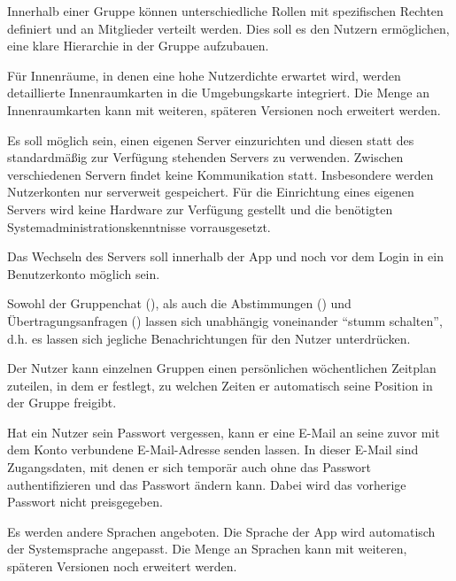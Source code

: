 \documentclass[parskip=full,11pt]{scrartcl}
\begin{document}
Innerhalb einer Gruppe können unterschiedliche Rollen
mit spezifischen Rechten definiert und an Mitglieder verteilt werden.
Dies soll es den Nutzern ermöglichen,
eine klare Hierarchie in der Gruppe aufzubauen.

%
Für Innenräume, in denen eine hohe Nutzerdichte erwartet wird, werden
detaillierte Innenraumkarten in die Umgebungskarte integriert. Die Menge an
Innenraumkarten kann mit weiteren, späteren Versionen noch erweitert werden.

%
Es soll möglich sein, einen eigenen Server einzurichten und diesen statt des
standardmäßig zur Verfügung stehenden Servers zu verwenden.
Zwischen verschiedenen Servern findet keine Kommunikation statt.
Insbesondere werden Nutzerkonten nur serverweit gespeichert.
Für die Einrichtung eines eigenen Servers wird keine Hardware zur Verfügung
gestellt und die benötigten Systemadministrationskenntnisse vorrausgesetzt.

%
Das Wechseln des Servers soll innerhalb der App und noch vor dem Login in ein
Benutzerkonto möglich sein.

%
Sowohl der Gruppenchat (), als auch die
Abstimmungen () und Übertragungsanfragen
() lassen sich unabhängig voneinander
\enquote{stumm schalten}, d.h. es lassen sich jegliche Benachrichtungen für den
Nutzer unterdrücken.

%
Der Nutzer kann einzelnen Gruppen einen persönlichen wöchentlichen Zeitplan
zuteilen, in dem er festlegt, zu welchen Zeiten er automatisch seine Position
in der Gruppe freigibt.

%
Hat ein Nutzer sein Passwort vergessen, kann er eine E-Mail an seine zuvor
mit dem Konto verbundene E-Mail-Adresse senden lassen.
In dieser E-Mail sind Zugangsdaten, mit denen er sich temporär auch ohne das
Passwort authentifizieren und das Passwort ändern kann.
Dabei wird das vorherige Passwort nicht preisgegeben.

Es werden andere Sprachen angeboten.
Die Sprache der App wird automatisch der Systemsprache angepasst.
Die Menge an Sprachen kann mit weiteren, späteren Versionen noch erweitert werden.
\end{document}
